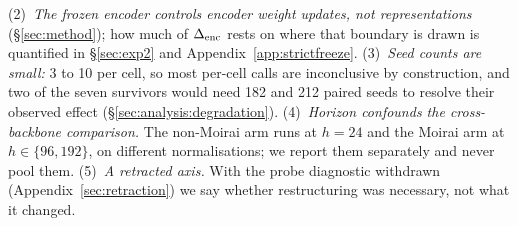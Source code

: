 (2)~\emph{The frozen encoder controls encoder weight updates, not
representations} (\S\ref{sec:method}); how much of $\Delta_\text{enc}$ rests on where that
boundary is drawn is quantified in \S\ref{sec:exp2} and
Appendix~\ref{app:strictfreeze}.
(3)~\emph{Seed counts are small:} 3 to 10 per cell, so most per-cell calls are
inconclusive by construction, and two of the seven survivors would need 182 and
212 paired seeds to resolve their observed effect
(\S\ref{sec:analysis:degradation}).
(4)~\emph{Horizon confounds the cross-backbone comparison.} The non-Moirai arm
runs at $h{=}24$ and the Moirai arm at $h{\in}\{96,192\}$, on different
normalisations; we report them separately and never pool them.
(5)~\emph{A retracted axis.} With the probe diagnostic withdrawn
(Appendix~\ref{sec:retraction}) we say whether restructuring was necessary, not what it changed.
